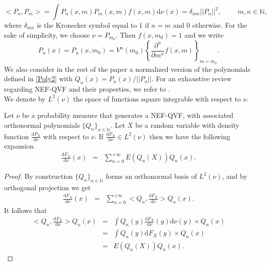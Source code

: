 \[
<P_{n},P_{m}>=\int P_{n}(x,m)P_{m}(x,m)f(x,m)\text{d}\nu(x)=\delta_{nm}||P_{n}||^{2},\hspace{1cm}m,n\in\mathbb{N},
\]
where $\delta_{mn}$ is the Kronecker symbol equal to $1$ if $n=m$ and $0$ otherwise. For the sake of simplicity, we choose $\nu=P_{m_{0}}$. Then $f(x,m_{0})=1$ and we write
\begin{equation}\label{Poly2}
P_{n}(x)=P_{n}(x,m_{0})=V^{n}(m_{0})\left\{\frac{\partial^{n}}{\partial m^{n}}f(x,m)\right\}_{m=m_{0}}.
\end{equation}
We also consider in the rest of the paper a normalized version of the polynomials defined in \eqref{Poly2} with $Q_{n}(x)=P_{n}(x)/||P_{n}||$. For an exhaustive review regarding NEF-QVF and their properties, we refer to \citet{Mo82}.\\
We denote by $L^{2}(\nu)$ the space of functions square integrable with respect to $\nu$.
\begin{Prop}\label{PolyExpansiontheo}
Let $\nu$ be a probability measure that generates a NEF-QVF, with associated orthonormal polynomials $\{Q_n\} _{n\in\mathbb{N}}$. Let $X$ be a random variable with density function $\frac{dP_{X}}{\text{d}\nu}$  with respect to $\nu$. If $\frac{\text{d}F_{X}}{\text{d}\nu}\in L^{2}(\nu)$ then we have the following expansion
\begin{eqnarray}
\frac{\text{d}F_{X}}{\text{d}\nu}(x)%
&=&\sum^{+\infty}_{n=0}E(Q_{n}(X))Q_{n}(x). \label{PolyExpansionEqnl3}
\end{eqnarray}
\end{Prop}
\begin{proof}
By construction $\{Q_{n}\}_{n\in\mathbb{N}}$ forms an orthonormal basis of $L^{2}(\nu)$, 
and by orthogonal projection we get
\begin{eqnarray*}
\frac{\text{d}F_{X}}{\text{d}\nu}(x)&=&\sum^{+\infty}_{n=0}<Q_{n},\frac{\text{d}F_{X}}{\text{d}\nu}>Q_{n}(x).
\end{eqnarray*}
It follows that 
\begin{eqnarray*}
<Q_n,\frac{\text{d}F_{X}}{\text{d}\nu}>Q_{n}(x)&=&\int Q_{n}(y)\frac{\text{d}F_{X}}{\text{d}\nu}(y)\text{d}\nu(y)\times Q_{n}(x)\\
&=&\int Q_{n}(y)\text{d}F_{X}(y)\times Q_{n}(x) \\
&=&E(Q_{n}(X))Q_{n}(x).
\end{eqnarray*}
\end{proof}
